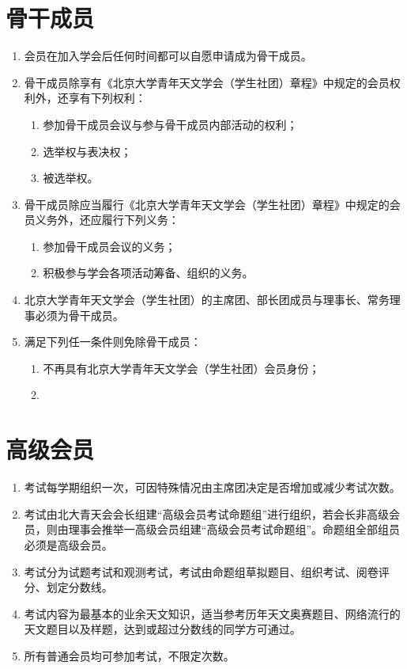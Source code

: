 \section{骨干成员}

\begin{enumerate}[resume]
    \item 会员在加入学会后任何时间都可以自愿申请成为骨干成员。
    
    \item 骨干成员除享有《北京大学青年天文学会（学生社团）章程》中规定的会员权利外，还享有下列权利：
    \begin{enumerate}
        \item 参加骨干成员会议与参与骨干成员内部活动的权利；
        \item 选举权与表决权；
        \item 被选举权。
    \end{enumerate}

    \item 骨干成员除应当履行《北京大学青年天文学会（学生社团）章程》中规定的会员义务外，还应履行下列义务：
    \begin{enumerate}
        \item 参加骨干成员会议的义务；
        \item 积极参与学会各项活动筹备、组织的义务。
    \end{enumerate}
    
    \item 北京大学青年天文学会（学生社团）的主席团、部长团成员与理事长、常务理事必须为骨干成员。
    
    \item 满足下列任一条件则免除骨干成员：
    \begin{enumerate}
        \item 不再具有北京大学青年天文学会（学生社团）会员身份；
        \item 
    \end{enumerate}
\end{enumerate}

\section{高级会员}

\begin{enumerate}[resume]
    \item 考试每学期组织一次，可因特殊情况由主席团决定是否增加或减少考试次数。
    
    \item 考试由北大青天会会长组建“高级会员考试命题组”进行组织，若会长非高级会员，则由理事会推举一高级会员组建“高级会员考试命题组”。命题组全部组员必须是高级会员。
    
    \item 考试分为试题考试和观测考试，考试由命题组草拟题目、组织考试、阅卷评分、划定分数线。
    
    \item 考试内容为最基本的业余天文知识，适当参考历年天文奥赛题目、网络流行的天文题目以及样题，达到或超过分数线的同学方可通过。
    
    \item 所有普通会员均可参加考试，不限定次数。
\end{enumerate}


